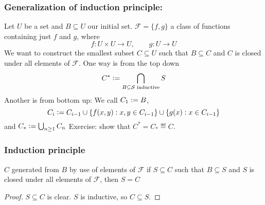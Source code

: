 \subsubsection*{Generalization of induction principle:}
Let $U$ be a set and $B\subseteq U$ our initial set.
$\mathcal{F} = \{f,g\}$ a class of functions containing just $f$ and $g$, where $$f:U\times U\to U, \qquad g: U\to U$$
We want to construct the smallest subset $C\subseteq U$ such that $B\subseteq C$ and $C$ is closed under all elements of $\mathcal{F}$.
\noindent One way is from the top down $$C^* \vcentcolon= \bigcap_{B\subseteq \mathcal{S} \text{ inductive}}{S}$$
Another is from bottom up: We call $C_1 \vcentcolon= B$, 
$$C_i \vcentcolon= C_{i-1} \cup \{f(x,y) : x,y\in C_{i-1}\}\cup \{g(x) : x\in C_{i-1}\}$$
and $C_* \vcentcolon= \bigcup_{n\geq 1}{C_{n}}$
Exercise: show that $C^* = C_*\eqdef C$.
\subsubsection*{Induction principle}
$C$ generated from $B$ by use of elements of $\mathcal{F}$ if $S\subseteq C$ such that $B\subseteq S$ and $S$ is closed under all
elements of $\mathcal{F}$, then $S = C$
\begin{proof}
    $S\subseteq C$ is clear.
    $S$ is inductive, so $C\subseteq S$.
\end{proof}

